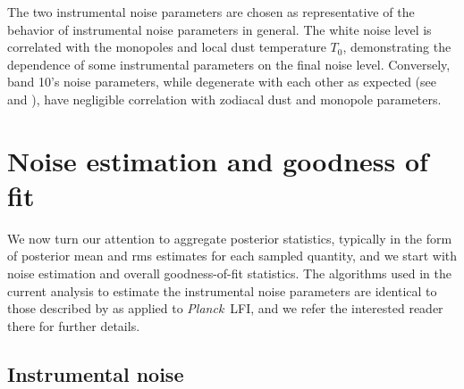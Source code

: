\documentclass{aa}
\def\Planck{\textit{Planck}}
\begin{document}
The two instrumental noise parameters are chosen as representative of the behavior of instrumental noise parameters in general. The white noise level is correlated with the monopoles and local dust temperature $T_0$, demonstrating the dependence of some instrumental parameters on the final noise level. Conversely, band 10's noise parameters, while degenerate with each other as expected (see \citealt{bp04} and \citealt{bp06}), have negligible correlation with zodiacal dust and monopole parameters.




\section{Noise estimation and goodness of fit}
\label{sec:noise_gof}

We now turn our attention to aggregate posterior statistics, typically
in the form of posterior mean and rms estimates for each sampled
quantity, and we start with noise estimation and overall
goodness-of-fit statistics. The algorithms used in the current
analysis to estimate the instrumental noise parameters are identical
to those described by \citet{bp06} as applied to \Planck\ LFI, and we
refer the interested reader there for further details.

\subsection{Instrumental noise}
\end{document}

